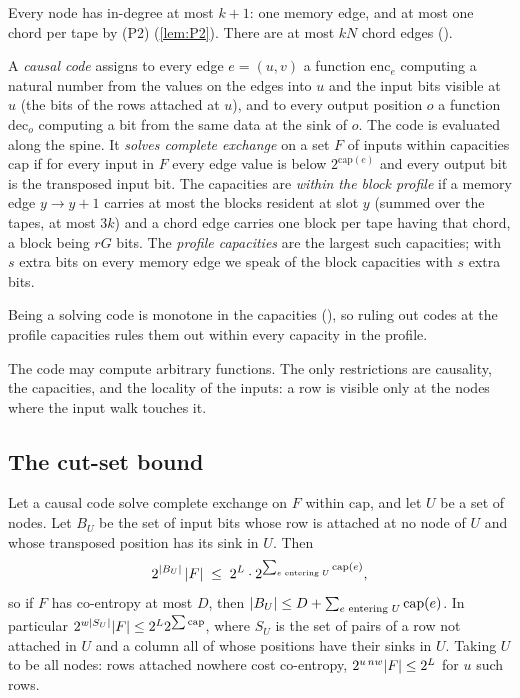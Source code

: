 Every node has in-degree at most $k+1$: one memory edge, and at most one chord per tape by (P2)
(\cref{lem:P2}). There are at most $kN$ chord edges ().

\begin{definition}\label{def:code}
A \emph{causal code} assigns to every edge $e=(u,v)$ a function $\mathrm{enc}_e$ computing a natural
number from the values on the edges into $u$ and the input bits visible at $u$ (the bits of the rows
attached at $u$), and to every output position $o$ a function $\mathrm{dec}_o$ computing a bit from
the same data at the sink of $o$. The code is evaluated along the spine. It \emph{solves complete
exchange} on a set $F$ of inputs within capacities $\mathrm{cap}$ if for every input in $F$ every edge
value is below $2^{\mathrm{cap}(e)}$ and every output bit is the transposed input bit. The capacities
are \emph{within the block profile} if a memory edge $y\to y+1$ carries at most the blocks resident at
slot $y$ (summed over the tapes, at most $3k$) and a chord edge carries one block per tape having that
chord, a block being $rG$ bits. The \emph{profile capacities} are the largest such capacities; with
$s$ extra bits on every memory edge we speak of the block capacities with $s$ extra bits.
\end{definition}

Being a solving code is monotone in the capacities (), so ruling out codes at the
profile capacities rules them out within every capacity in the profile.

The code may compute arbitrary functions. The only restrictions are causality, the capacities, and
the locality of the inputs: a row is visible only at the nodes where the input walk touches it.

\subsection{The cut-set bound}

\begin{lemma}\label{lem:cutset}
Let a causal code solve complete exchange on $F$ within $\mathrm{cap}$, and let $U$ be a set of
nodes. Let $B_U$ be the set of input bits whose row is attached at no node of $U$ and whose
transposed position has its sink in $U$. Then
\[
  2^{\lvert B_U \rvert}\,\lvert F \rvert\;\le\;2^{L}\cdot2^{\sum_{e\text{ entering }U}\mathrm{cap}(e)} ,
\]
so if $F$ has co-entropy at most $D$, then $\lvert B_U \rvert\le D+\sum_{e\text{ entering }U}\mathrm{cap}(e)$.
In particular $2^{w\lvert S_U \rvert}\lvert F \rvert\le2^L2^{\sum\mathrm{cap}}$, where $S_U$ is the set of pairs of a row
not attached in $U$ and a column all of whose positions have their sinks in $U$. Taking $U$ to be all
nodes: rows attached nowhere cost co-entropy, $2^{u\,nw}\lvert F \rvert\le2^L$ for $u$ such rows.
\end{lemma}

